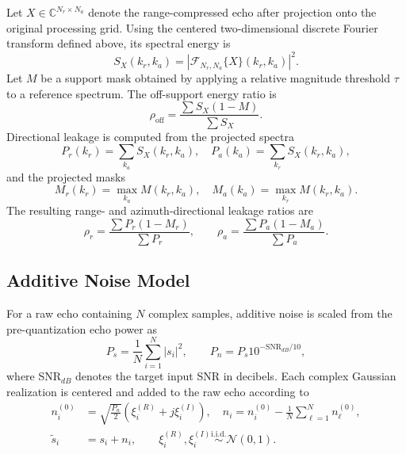 \documentclass[conference]{IEEEtran}
\begin{document}
Let $X\in\mathbb{C}^{N_r\times N_a}$ denote the range-compressed echo after projection onto the original processing grid. Using the centered two-dimensional discrete Fourier transform defined above, its spectral energy is
\begin{equation}
    S_X(k_r,k_a)=|\mathcal{F}_{N_r,N_a}\{X\}(k_r,k_a)|^2.
\end{equation}
Let $M$ be a support mask obtained by applying a relative magnitude threshold $\tau$ to a reference spectrum. The off-support energy ratio is
\begin{equation}
    \rho_{\mathrm{off}}
    =\frac{\sum S_X(1-M)}{\sum S_X}.
\end{equation}
Directional leakage is computed from the projected spectra
\begin{equation}
    P_r(k_r)=\sum_{k_a}S_X(k_r,k_a),\quad
    P_a(k_a)=\sum_{k_r}S_X(k_r,k_a),
\end{equation}
and the projected masks
\begin{equation}
    M_r(k_r)=\max_{k_a}M(k_r,k_a),\quad
    M_a(k_a)=\max_{k_r}M(k_r,k_a).
\end{equation}
The resulting range- and azimuth-directional leakage ratios are
\begin{equation}
    \rho_r=\frac{\sum P_r(1-M_r)}{\sum P_r},\qquad
    \rho_a=\frac{\sum P_a(1-M_a)}{\sum P_a}.
\end{equation}

\subsection{Additive Noise Model}

For a raw echo containing $N$ complex samples, additive noise is scaled from the pre-quantization echo power as
\begin{equation}
    P_s=\frac{1}{N}\sum_{i=1}^{N}|s_i|^2,\qquad
    P_n=P_s10^{-\mathrm{SNR}_{dB}/10},
\end{equation}
where SNR$_{dB}$ denotes the target input SNR in decibels. Each complex Gaussian realization is centered and added to the raw echo according to
\begin{equation}
    \begin{aligned}
        n_i^{(0)}&=\sqrt{\frac{P_n}{2}}\left(\xi_i^{(R)}+j\xi_i^{(I)}\right),\quad
        n_i=n_i^{(0)}-\frac{1}{N}\sum_{\ell=1}^{N}n_\ell^{(0)},\\
        \widetilde{s}_i&=s_i+n_i,\qquad
        \xi_i^{(R)},\xi_i^{(I)}\overset{\mathrm{i.i.d.}}{\sim}\mathcal{N}(0,1).
    \end{aligned}
\end{equation}
\end{document}
